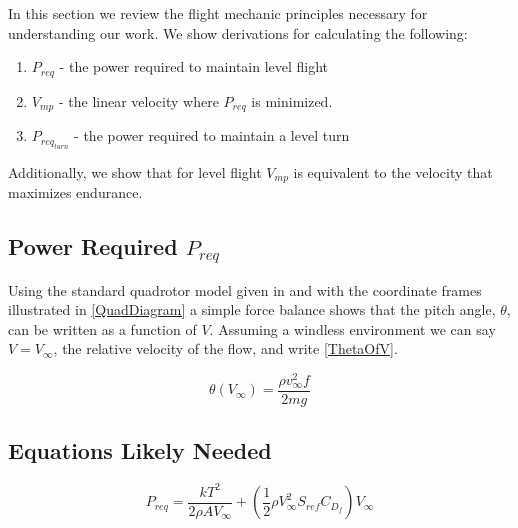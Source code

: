 
In this section we review the flight mechanic principles necessary for understanding our work. We show derivations for calculating the following: \begin{enumerate}
    \item $P_{req}$ - the power required to maintain level flight 
    \item $V_{mp}$ - the linear velocity where $P_{req}$ is minimized.
    \item $P_{req_{turn}}$ - the power required to maintain a level turn
\end{enumerate} Additionally, we show that for level flight $V_{mp}$ is equivalent to the velocity that maximizes endurance.

\subsection{Power Required $P_{req}$}
Using the standard quadrotor model given in \cite{hoffmann2004stanford} and \cite{pounds2002design} with the coordinate frames illustrated in \ref{QuadDiagram} a simple force balance shows that the pitch angle, $\theta$, can be written as a function of $V$. Assuming a windless environment we can say $V = V_\infty$, the relative velocity of the flow, and write \eqref{ThetaOfV}.

\begin{equation}
    \label{ThetaOfV}
    \theta(V_\infty) = \frac{\rho v_\infty^2 f}{2mg}
\end{equation}

\subsection{Equations Likely Needed}

\begin{equation}
    \label{LevelFlightEqn}
    P_{req} = \frac{k T^2}{2\rho A V_\infty}+(\frac{1}{2}\rho V_\infty^2 S_{ref} C_{D_f})V_\infty
\end{equation}


